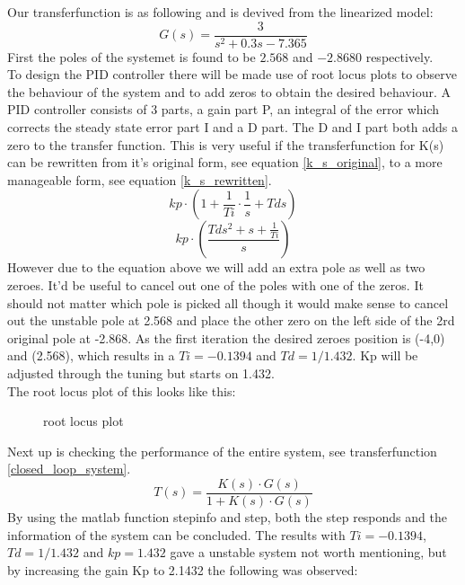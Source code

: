 \documentclass[12pt]{article}
\begin{document}
Our transferfunction is as following and is devived from the linearized model:
\begin{equation} \label{G_s}
  G(s) = \frac{3}{s^2 + 0.3s -7.365}
\end{equation}
First the poles of the systemet is found to be $2.568$ and $-2.8680$ respectively.\\
To design the PID controller there will be made use of root locus plots to observe the behaviour of the system and to add zeros to obtain the desired behaviour. A PID controller consists of 3 parts, a gain part P, an integral of the error which corrects the steady state error part I and a D part. The D and I part both adds a zero to the transfer function. This is very useful if the transferfunction for K(s) can be rewritten from it's original form, see equation \ref{k_s_original}, to a more manageable form, see equation \ref{k_s_rewritten}.
\begin{equation} \label{k_s_original}
  kp\cdot(1+\frac{1}{Ti}\cdot \frac{1}{s}+Tds)
\end{equation}
\begin{equation} \label{k_s_rewritten}
  kp\cdot(\frac{Tds^2 + s + \frac{1}{Ti}}{s})
\end{equation}
However due to the equation above we will add an extra pole as well as two zeroes. It'd be useful to cancel out one of the poles with one of the zeros. It should not matter which pole is picked all though it would make sense to cancel out the unstable pole at 2.568 and place the other zero on the left side of the 2rd original pole at -2.868. As the first iteration the desired zeroes position is (-4,0) and (2.568), which results in a $Ti = -0.1394$ and $Td = 1/1.432$. Kp will be adjusted through the tuning but starts on 1.432.\\
The root locus plot of this looks like this:
\begin{figure}[htbp]
  \centering
  
  \caption{root locus plot} \label{my_root_locus_plot}
\end{figure}
Next up is checking the performance of the entire system, see transferfunction \ref{closed_loop_system}.
\begin{equation} \label{closed_loop_system}
    T(s) = \frac{K(s) \cdot G(s)}{1+K(s)\cdot G(s)}
\end{equation}
By using the matlab function stepinfo and step, both the step responds and the information of the system can be concluded. The results with $Ti = -0.1394$, $Td = 1/1.432$ and $kp = 1.432$ gave a unstable system not worth mentioning, but by increasing the gain Kp to 2.1432 the following was observed:
\end{document}
